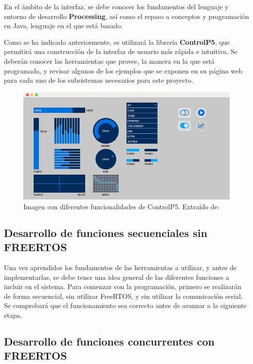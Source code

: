 En el ámbito de la interfaz, se debe conocer los fundamentos del lenguaje y entorno de desarrollo \textbf{Processing}, así como el repaso a conceptos y programación en Java, lenguaje en el que está basado. \cite{processing}

Como se ha indicado anteriormente, se utilizará la librería \textbf{ControlP5}, que permitirá una construcción de la interfaz de usuario más rápida e intuitiva. Se deberán conocer las herramientas que provee, la manera en la que está programada, y revisar algunos de los ejemplos que se exponen en su página web \cite{cp5_examples} para cada uno de los subsistemas necesarios para este proyecto.

\begin{figure}[h]
    \centering
    \includegraphics[width=1\textwidth]{imagenes/cp5_examples.png}
    \caption{Imagen con diferentes funcionalidades de ControlP5. Extraído de: \cite{cp5_image}}
\end{figure}

\subsection{Desarrollo de funciones secuenciales sin FREERTOS }

Una vez aprendidos los fundamentos de las herramientas a utilizar, y antes de implementarlas, se debe tener una idea general de las diferentes funciones a incluir en el sistema. Para comenzar con la programación, primero se realizarán de forma secuencial, sin utilizar FreeRTOS, y sin utilizar la comunicación serial. Se comprobará que el funcionamiento sea correcto antes de avanzar a la siguiente etapa. 

\subsection{Desarrollo de funciones concurrentes con FREERTOS}

